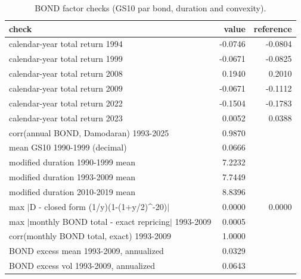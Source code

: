 \begin{table}[htbp]\centering\small
\caption{BOND factor checks (GS10 par bond, duration and convexity).}
\label{tab:m8_bond}
\begin{tabular}{lrr}
\toprule
check & value & reference \\
\midrule
calendar-year total return 1994 & -0.0746 & -0.0804 \\
calendar-year total return 1999 & -0.0671 & -0.0825 \\
calendar-year total return 2008 & 0.1940 & 0.2010 \\
calendar-year total return 2009 & -0.0671 & -0.1112 \\
calendar-year total return 2022 & -0.1504 & -0.1783 \\
calendar-year total return 2023 & 0.0052 & 0.0388 \\
corr(annual BOND, Damodaran) 1993-2025 & 0.9870 &  \\
mean GS10 1990-1999 (decimal) & 0.0666 &  \\
modified duration 1990-1999 mean & 7.2232 &  \\
modified duration 1993-2009 mean & 7.7449 &  \\
modified duration 2010-2019 mean & 8.8396 &  \\
max $|$D - closed form (1/y)(1-(1+y/2)\^{}-20)$|$ & 0.0000 & 0.0000 \\
max $|$monthly BOND total - exact repricing$|$ 1993-2009 & 0.0005 &  \\
corr(monthly BOND total, exact) 1993-2009 & 1.0000 &  \\
BOND excess mean 1993-2009, annualized & 0.0329 &  \\
BOND excess vol 1993-2009, annualized & 0.0643 &  \\
\bottomrule
\end{tabular}
\end{table}
